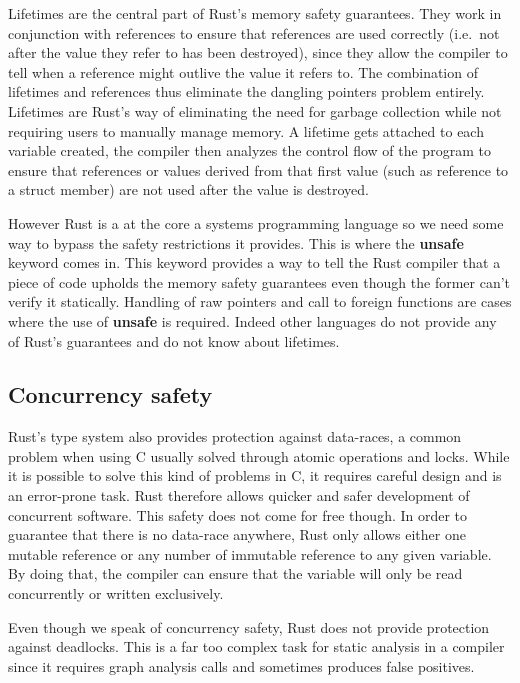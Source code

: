 \documentclass[11pt]{article}
\begin{document}
Lifetimes are the central part of Rust's memory safety
guarantees. They work in conjunction with references to ensure
that references are used correctly (i.e.\ not after the value they
refer to has been destroyed), since they allow the compiler to tell
when a reference might outlive the value it refers to. The combination
of lifetimes and references thus eliminate the dangling pointers
problem entirely. Lifetimes are Rust's way of eliminating the need for
garbage collection while not requiring users to manually manage
memory. A lifetime gets attached to each variable created, the
compiler then analyzes the control flow of the program to ensure that
references or values derived from that first value (such as reference
to a struct member) are not used after the value is destroyed.

However Rust is a at the core a systems programming language so we
need some way to bypass the safety restrictions it provides. This is
where the \textbf{unsafe} keyword comes in. This keyword provides a
way to tell the Rust compiler that a piece of code upholds the memory
safety guarantees even though the former can't verify it
statically. Handling of raw pointers and call to foreign functions are
cases where the use of \textbf{unsafe} is required. Indeed other
languages do not provide any of Rust's guarantees and do not know
about lifetimes.

\subsection{Concurrency safety}

Rust's type system also provides protection against data-races, a
common problem when using C usually solved through atomic operations
and locks. While it is possible to solve this kind of problems in C,
it requires careful design and is an error-prone task. Rust therefore
allows quicker and safer development of concurrent software. This safety
does not come for free though. In order to guarantee that there is no
data-race anywhere, Rust only allows either one mutable reference or
any number of immutable reference to any given variable. By doing
that, the compiler can ensure that the variable will only be read
concurrently or written exclusively.

Even though we speak of concurrency safety, Rust does not provide
protection against deadlocks. This is a far too complex task for
static analysis in a compiler since it requires graph analysis calls
and sometimes produces false positives.
\end{document}
